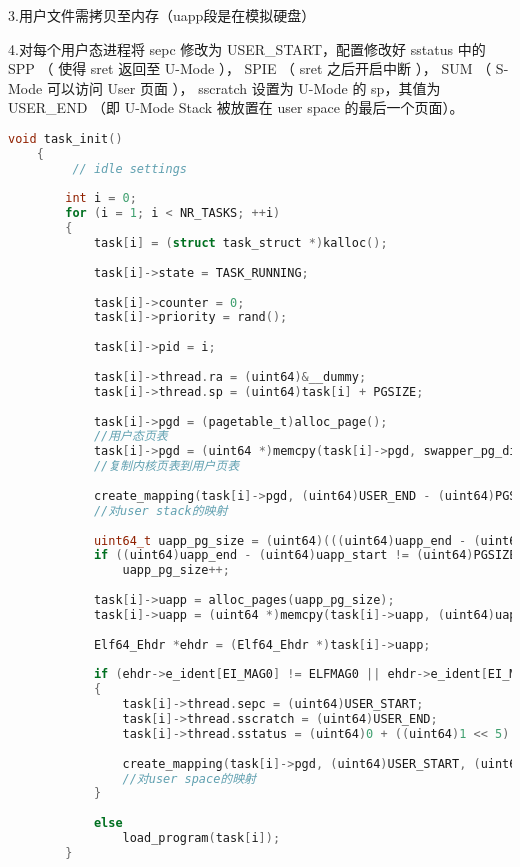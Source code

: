 \documentclass{source/Report}
\begin{document}
3.用户文件需拷贝至内存（uapp段是在模拟硬盘）

4.对每个用户态进程将 sepc 修改为 USER\_START，配置修改好 sstatus 中的 SPP （ 使得 sret 返回至 U-Mode ）， SPIE （ sret 之后开启中断 ）， SUM （ S-Mode 可以访问 User 页面 ）， sscratch 设置为 U-Mode 的 sp，其值为 USER\_END （即  U-Mode Stack 被放置在 user space 的最后一个页面）。

\begin{lstlisting}[language = c, title = {task\_init}]
    void task_init()
    {
         // idle settings
    
        int i = 0;
        for (i = 1; i < NR_TASKS; ++i)
        {
            task[i] = (struct task_struct *)kalloc();
    
            task[i]->state = TASK_RUNNING;
    
            task[i]->counter = 0;
            task[i]->priority = rand();
    
            task[i]->pid = i;
    
            task[i]->thread.ra = (uint64)&__dummy;
            task[i]->thread.sp = (uint64)task[i] + PGSIZE;
    
            task[i]->pgd = (pagetable_t)alloc_page();
            //用户态页表
            task[i]->pgd = (uint64 *)memcpy(task[i]->pgd, swapper_pg_dir, 512 * sizeof(uint64));
            //复制内核页表到用户页表
    
            create_mapping(task[i]->pgd, (uint64)USER_END - (uint64)PGSIZE, (uint64)alloc_page() - (uint64)PA2VA_OFFSET, (uint64)PGSIZE, (uint64)VM_USER_PERM_R_W_X);
            //对user stack的映射
    
            uint64_t uapp_pg_size = (uint64)(((uint64)uapp_end - (uint64)uapp_start) / (uint64)PGSIZE);
            if ((uint64)uapp_end - (uint64)uapp_start != (uint64)PGSIZE * uapp_pg_size)
                uapp_pg_size++;
    
            task[i]->uapp = alloc_pages(uapp_pg_size);
            task[i]->uapp = (uint64 *)memcpy(task[i]->uapp, (uint64)uapp_start, (uint64)uapp_end - (uint64)uapp_start); //拷贝user space至自己的空间
    
            Elf64_Ehdr *ehdr = (Elf64_Ehdr *)task[i]->uapp;
    
            if (ehdr->e_ident[EI_MAG0] != ELFMAG0 || ehdr->e_ident[EI_MAG1] != ELFMAG1 || ehdr->e_ident[EI_MAG2] != ELFMAG2 || ehdr->e_ident[EI_MAG3] != ELFMAG3)
            {
                task[i]->thread.sepc = (uint64)USER_START;
                task[i]->thread.sscratch = (uint64)USER_END;
                task[i]->thread.sstatus = (uint64)0 + ((uint64)1 << 5) + ((uint64)0 << 8) + ((uint64)1 << 18);
    
                create_mapping(task[i]->pgd, (uint64)USER_START, (uint64)task[i]->uapp - (uint64)PA2VA_OFFSET, (uint64)uapp_end - (uint64)uapp_start, (uint64)VM_USER_PERM_R_W_X);
                //对user space的映射
            }
    
            else
                load_program(task[i]);
        }
    
\end{lstlisting}
\end{document}
